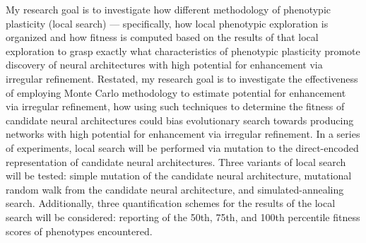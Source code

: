 My research goal is to investigate how different methodology of phenotypic plasticity (local search) --- specifically, how local phenotypic exploration is organized and how fitness is computed based on the results of that local exploration to grasp exactly what characteristics of phenotypic plasticity promote discovery of neural architectures with high potential for enhancement via irregular refinement. Restated, my research goal is to investigate the effectiveness of employing Monte Carlo methodology to estimate potential for enhancement via irregular refinement, how using such techniques to determine the fitness of candidate neural architectures could bias evolutionary search towards producing networks with high potential for enhancement via irregular refinement. In a series of experiments, local search will be performed via mutation to the direct-encoded representation of candidate neural architectures. Three variants of local search will be tested: simple mutation of the candidate neural architecture, mutational random walk from the candidate neural architecture, and simulated-annealing search. Additionally, three quantification schemes for the results of the local search will be considered: reporting of the 50th, 75th, and 100th percentile fitness scores of phenotypes encountered.






